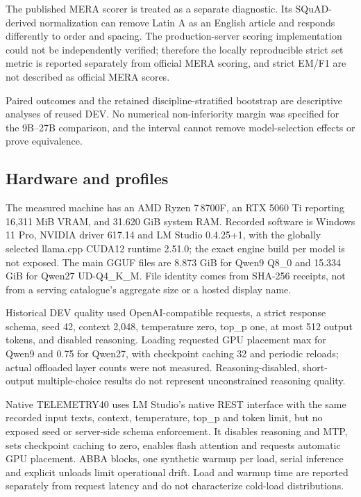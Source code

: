 \documentclass[10pt,a4paper]{article}
\begin{document}
The published MERA scorer is treated as a separate diagnostic. Its SQuAD-derived normalization can remove Latin A as an English article and responds differently to order and spacing. The production-server scoring implementation could not be independently verified; therefore the locally reproducible strict set metric is reported separately from official MERA scoring, and strict EM/F1 are not described as official MERA scores.

Paired outcomes and the retained discipline-stratified bootstrap are descriptive analyses of reused DEV. No numerical non-inferiority margin was specified for the 9B–27B comparison, and the interval cannot remove model-selection effects or prove equivalence.

\subsection*{Hardware and profiles}
The measured machine has an AMD Ryzen 7\,8700F, an RTX 5060 Ti reporting 16,311 MiB VRAM, and 31.620 GiB system RAM. Recorded software is Windows 11 Pro, NVIDIA driver 617.14 and LM Studio 0.4.25+1, with the globally selected llama.cpp CUDA12 runtime 2.51.0; the exact engine build per model is not exposed. The main GGUF files are 8.873 GiB for Qwen9 Q8\_0 and 15.334 GiB for Qwen27 UD-Q4\_K\_M. File identity comes from SHA-256 receipts, not from a serving catalogue's aggregate size or a hosted display name.

Historical DEV quality used OpenAI-compatible requests, a strict response schema, seed 42, context 2,048, temperature zero, top\_p one, at most 512 output tokens, and disabled reasoning. Loading requested GPU placement max for Qwen9 and 0.75 for Qwen27, with checkpoint caching 32 and periodic reloads; actual offloaded layer counts were not measured. Reasoning-disabled, short-output multiple-choice results do not represent unconstrained reasoning quality.

Native TELEMETRY40 uses LM Studio's native REST interface with the same recorded input texts, context, temperature, top\_p and token limit, but no exposed seed or server-side schema enforcement. It disables reasoning and MTP, sets checkpoint caching to zero, enables flash attention and requests automatic GPU placement. ABBA blocks, one synthetic warmup per load, serial inference and explicit unloads limit operational drift. Load and warmup time are reported separately from request latency and do not characterize cold-load distributions.
\end{document}
